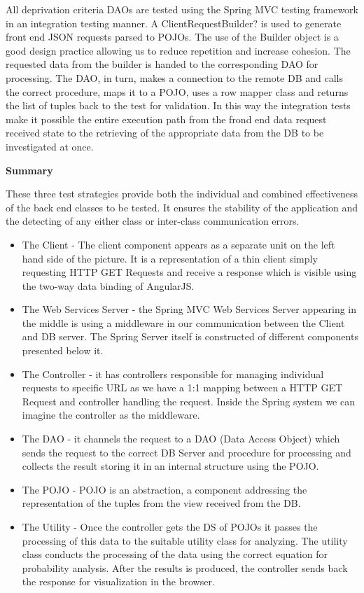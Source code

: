 \documentclass{l3proj}
\begin{document}
All deprivation criteria DAOs are tested using the Spring MVC testing framework in an integration testing manner. A ClientRequestBuilder? is used to generate front end JSON requests parsed to POJOs. The use of the Builder object is a good design practice allowing us to reduce repetition and increase cohesion. The requested data from the builder is handed to the corresponding DAO for processing. The DAO, in turn, makes a connection to the remote DB and calls the correct procedure, maps it to a POJO, uses a row mapper class and returns the list of tuples back to the test for validation. In this way the integration tests make it possible the entire execution path from the frond end data request received state to the retrieving of the appropriate data from the DB to be investigated at once.

\textbf{Summary}

These three test strategies provide both the individual and combined effectiveness of the back end classes to be tested. It ensures the stability of the application and the detecting of any either class or inter-class communication errors.


\begin{itemize}
\item The Client - The client component appears as a separate unit on the left hand side of the picture. It is a representation of a thin client simply requesting HTTP GET Requests and receive a response which is visible using the two-way data binding of AngularJS.

\item The Web Services Server - the Spring MVC Web Services Server appearing in the middle is using a middleware in our communication between the Client and DB server. The Spring Server itself is constructed of different components presented below it.

\item The Controller - it has controllers responsible for managing individual requests to specific URL as we have a 1:1 mapping between a HTTP GET Request and controller handling the request. Inside the Spring system we can imagine the controller as the middleware.

\item The DAO - it channels the request to a DAO (Data Access Object) which sends the request to the correct DB Server and procedure for processing and collects the result storing it in an internal structure using the POJO.

\item The POJO - POJO is an abstraction, a component addressing the representation of the tuples from the view received from the DB.

\item The Utility - Once the controller gets the DS of POJOs it passes the processing of this data to the suitable utility class for analyzing. The utility class conducts the processing of the data using the correct equation for probability analysis. After the results is produced, the controller sends back the response for visualization in the browser. 
\end{itemize}
\end{document}
